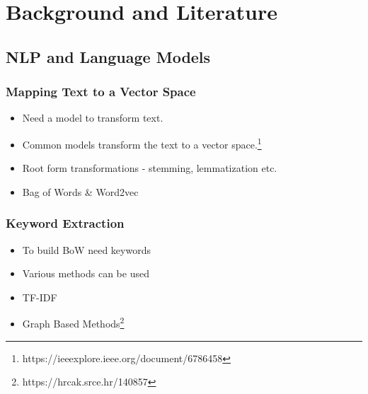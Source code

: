 \documentclass{beamer}
\begin{document}
\section{Background and Literature} 

\subsection{NLP and Language Models}

\begin{frame}
    \frametitle{Mapping Text to a Vector Space}
    \begin{itemize}
        \item Need a model to transform text.
        \item Common models transform the text to a vector space.\footnote{https://ieeexplore.ieee.org/document/6786458}
        \item Root form transformations - stemming, lemmatization etc.
        \item Bag of Words \& Word2vec
    \end{itemize}
\end{frame}

\begin{frame}
    \frametitle{Keyword Extraction}
    \begin{itemize}
        \item To build BoW need keywords
        \item Various methods can be used
        \item TF-IDF
        \item Graph Based Methods\footnote{https://hrcak.srce.hr/140857}
    \end{itemize}
\end{frame}
\end{document}

